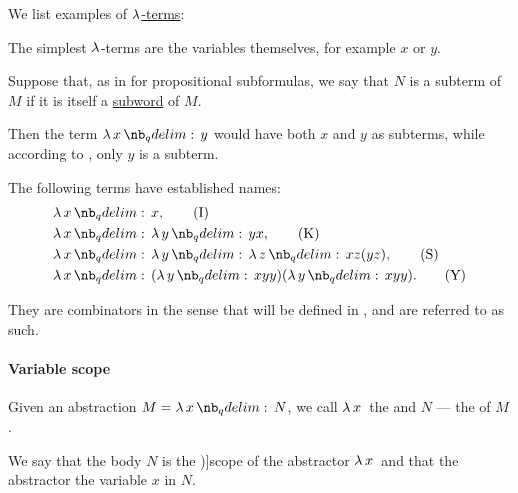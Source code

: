 \begin{example}\label{ex:def:lambda_term}
  We list examples of \hyperref[def:lambda_term]{\( \mathrm{\lambda} \)-terms}:
  \begin{thmenum}
     The simplest \( \mathrm{\lambda} \)-terms are the variables themselves, for example \( x \) or \( y \).

     Suppose that, as in  for propositional subformulas, we say that \( N \) is a subterm of \( M \) if it is itself a \hyperref[def:formal_language/subword]{subword} of \( M \).

    Then the term \( \qabs x y \) would have both \( x \) and \( y \) as subterms, while according to , only \( y \) is a subterm.

     The following terms have established names:
    \begin{align}
      &\qabs x x, \label{eq:ex:def:lambda_term/combinator/i}\tag{I} \\
      &\qabs x \qabs y yx, \nonumber\label{eq:ex:def:lambda_term/combinator/k}\tag{K} \\
      &\qabs x \qabs y \qabs z xz(yz), \label{eq:ex:def:lambda_term/combinator/s}\tag{S} \\
      &\qabs x (\qabs y xyy) (\qabs y xyy). \label{eq:ex:def:lambda_term/combinator/y}\tag{Y}
    \end{align}

    They are combinators in the sense that will be defined in , and are referred to as such.
  \end{thmenum}
\end{example}

\paragraph{Variable scope}

\begin{definition}\label{def:lambda_abstractor}
  Given an abstraction \( M = \qabs x N \), we call \( \quantifier* \synlambda x \) the  and \( N \) --- the  of \( M \).

  We say that the body \( N \) is the \term[ru=область действия (\cite[64]{Герасимов2011})]{scope} of the abstractor \( \quantifier* \synlambda x \) and that the abstractor  the variable \( x \) in \( N \).
\end{definition}

